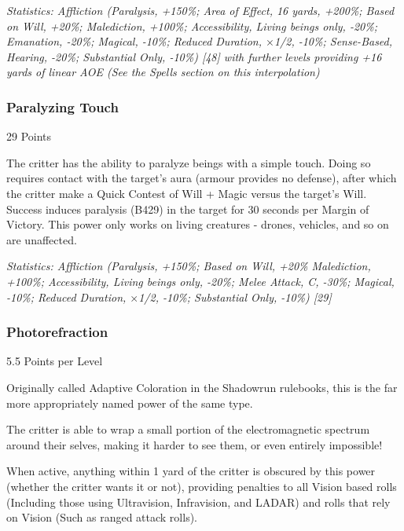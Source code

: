 \begin{multicols*}{3}
	\textcolor{OliveGreen}{\textit{Statistics: Affliction (Paralysis, +150\%; Area of Effect, 16 yards, +200\%; Based on Will, +20\%; Malediction, +100\%; Accessibility, Living beings only, -20\%; Emanation, -20\%; Magical, -10\%; Reduced Duration, $\times$1/2, -10\%; Sense-Based, Hearing, -20\%; Substantial Only, -10\%) [48] with further levels providing +16 yards of linear AOE (See the Spells section on this interpolation) }}

	\subsubsection{Paralyzing Touch}\label{paralyzing_touch}
	\begin{flushright}
		29 Points 
	\end{flushright}

	The critter has the ability to paralyze beings with a simple touch. Doing so requires contact with the target's aura (armour provides no defense), after which the critter make a Quick Contest of Will + Magic versus the target's Will. Success induces paralysis (B429) in the target for 30 seconds per Margin of Victory. This power only works on living creatures - drones, vehicles, and so on are unaffected.
	
	\textcolor{OliveGreen}{\textit{Statistics: Affliction (Paralysis, +150\%; Based on Will, +20\% Malediction, +100\%; Accessibility, Living beings only, -20\%; Melee Attack, C, -30\%; Magical, -10\%; Reduced Duration, $\times$1/2, -10\%; Substantial Only, -10\%) [29] }}
	
	\subsubsection{Photorefraction}\label{photorefraction}
	\begin{flushright}
		5.5 Points per Level
	\end{flushright}

	Originally called Adaptive Coloration in the Shadowrun rulebooks, this is the far more appropriately named power of the same type.
	
	The critter is able to wrap a small portion of the electromagnetic spectrum around their selves, making it harder to see them, or even entirely impossible!
	
	When active, anything within 1 yard of the critter is obscured by this power (whether the critter wants it or not), providing penalties to all Vision based rolls (Including those using Ultravision, Infravision, and LADAR) and rolls that rely on Vision (Such as ranged attack rolls).
	

\end{multicols*}

